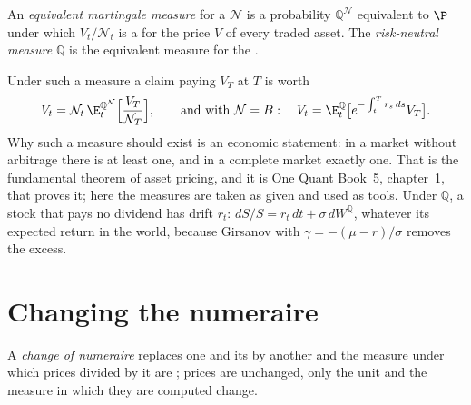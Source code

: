 \begin{definition}\label{def:qm:girsanov-and-changes-of-numeraire:emm}
An \emph{equivalent martingale measure} for a  $\mathcal N$
is a probability $\mathbb Q^{\mathcal N}$ equivalent to $\P$ under which $V_t/\mathcal N_t$ is a  for
the price $V$ of every traded asset. The \emph{risk-neutral measure}
$\mathbb Q$ is the equivalent  measure for the .
\end{definition}

Under such a measure a claim paying $V_T$ at $T$ is worth
\[
V_t = \mathcal N_t\,\E^{\mathbb Q^{\mathcal N}}_t\Bigl[\frac{V_T}{\mathcal N_T}\Bigr], \qquad\text{and with } \mathcal N = B:\quad V_t =
\E^{\mathbb Q}_t\bigl[e^{-\int_t^Tr_s\,ds}V_T\bigr].
\]
Why such a measure should exist is an economic statement: in a market without arbitrage there
is at least one, and in a complete market exactly one. That is the fundamental theorem of asset
pricing, and it is One Quant Book~5, chapter~1, that proves it; here the measures are taken as
given and used as tools. Under $\mathbb Q$, a stock that pays no dividend has drift $r_t$: $dS/S = r_t\,dt +
\sigma\,dW^{\mathbb Q}$, whatever its expected return in the world, because Girsanov with $\gamma = -(\mu -
r)/\sigma$ removes the excess.

\section{Changing the numeraire}

\begin{definition}\label{def:qm:girsanov-and-changes-of-numeraire:changenum}
A \emph{change of numeraire} replaces one  and its  by another  and the measure under which prices divided by it are
; prices are unchanged, only the unit and the measure in which they are computed change.
\end{definition}

